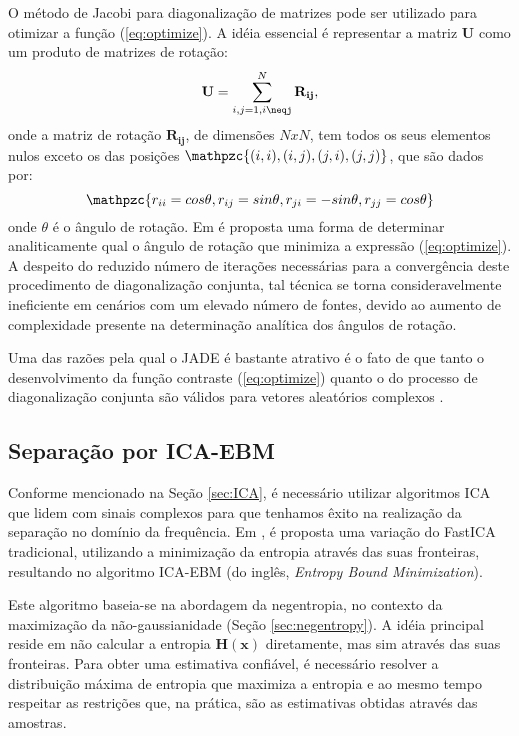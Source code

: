     O método de Jacobi para diagonalização de matrizes pode ser utilizado para otimizar a função (\ref{eq:optimize}). A idéia essencial é representar a matriz $\mathbf{U}$ como um produto de matrizes de rotação:
    \begin{equation}
        \mathbf{U} = \sum_{i,j=1,i\neqj}^N \mathbf{R_{ij}},
    \end{equation}
    onde a matriz de rotação $\mathbf{R_{ij}}$, de dimensões $NxN$, tem todos os seus elementos nulos exceto os das posições $\mathpzc{(i,i), (i,j), (j,i), (j,j)}$, que são dados por:
    \begin{equation}
        \mathpzc{r_{ii} = cos \theta, r_{ij} = sin \theta, r_{ji} = -sin \theta, r_{jj} = cos \theta}
    \end{equation}
    onde $\theta$ é o ângulo de rotação. Em \cite{JADE} é proposta uma forma de determinar analiticamente qual o ângulo de rotação que minimiza a expressão (\ref{eq:optimize}). A despeito do reduzido número de iterações necessárias para a convergência deste procedimento de diagonalização conjunta, tal técnica se torna consideravelmente ineficiente em cenários com um elevado número de fontes, devido ao aumento de complexidade presente na determinação analítica dos ângulos de rotação.
    
    Uma das razões pela qual o JADE é bastante atrativo é o fato de que tanto o desenvolvimento da função contraste (\ref{eq:optimize}) quanto o do processo de diagonalização conjunta são válidos para vetores aleatórios complexos \cite{JADE}. 

   \subsection{Separação por ICA-EBM}
        
    Conforme mencionado na Seção \ref{sec:ICA}, é necessário utilizar algoritmos ICA que lidem com sinais complexos para que tenhamos êxito na realização da separação no domínio da frequência. Em \cite{fasticaebm}, é proposta uma variação do FastICA tradicional, utilizando a minimização da entropia através das suas fronteiras, resultando no algoritmo ICA-EBM (do inglês, \textit{Entropy Bound Minimization}).
        
    Este algoritmo baseia-se na abordagem da negentropia, no contexto da maximização da não-gaussianidade (Seção \ref{sec:negentropy}). A idéia principal reside em não calcular a entropia $\mathbf{H(x)}$ diretamente, mas sim através das suas fronteiras. Para obter uma estimativa confiável, é necessário resolver a distribuição máxima de entropia que maximiza a entropia e ao mesmo tempo respeitar as restrições que, na prática, são as estimativas obtidas através das amostras. 
        
